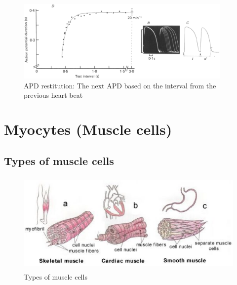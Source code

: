 \begin{figure}[hbt]
 \centerline{\includegraphics[height=4cm,
 angle=0]{./images/APD_restitution.eps}} 
 \caption{APD restitution: The next APD based on the interval from the previous
 heart beat \cite{boyett1978}}
\label{fig:APD_restitution}
\end{figure}


\citep{Kobayashi1992}



\chapter{Myocytes (Muscle cells)}
\label{chap:myocyt-muscle-cells}



\section{Types of muscle cells}
\label{sec:types-muscle-cells}


\begin{figure}[htb]
  \centerline{\includegraphics[height=5cm]{./images/muscle_cell_types.eps}}
  \caption{Types of muscle cells}\label{fig:muscle_cell_types}
\end{figure}

